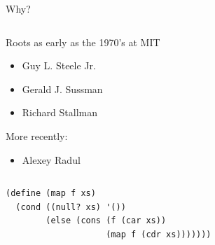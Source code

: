 \documentclass[usenames,dvipsnames,svgnames,table,aspectratio=1610,mathserif]{beamer}
\newcommand{\nl}{\vspace{\baselineskip}}
\begin{document}
\begin{frame}
\begin{columns}
\begin{column}{0.5\textwidth}
\begin{center}
      \nl

      Why?
    \end{center}
  \end{column}
\end{columns}

\end{frame}




\begin{frame}

\begin{columns}
\begin{column}{0.5\textwidth}
Roots as early as the 1970's at MIT
\begin{itemize}
  \item Guy L. Steele Jr. 
  \item Gerald J. Sussman
  \item Richard Stallman
\end{itemize}

\nl

More recently:
\begin{itemize}
  \item Alexey Radul
\end{itemize}
\end{column}
\begin{column}{0.5\textwidth}

\begin{figure}
\centering
\def\svgwidth{\columnwidth}

\end{figure}

\end{column}
\end{columns}

\end{frame}


\begin{frame}[fragile]

\begin{verbatim}
(define (map f xs)
  (cond ((null? xs) '())
        (else (cons (f (car xs))
                    (map f (cdr xs)))))))
\end{verbatim}
\end{frame}
\end{document}
